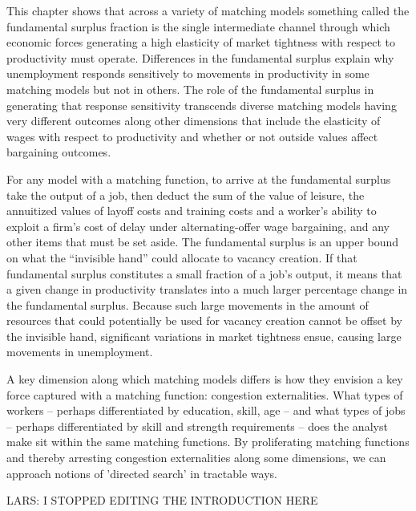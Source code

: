 This chapter shows that across a variety of matching models
something called the fundamental surplus fraction is the
single intermediate channel through which economic forces
generating a high elasticity of market tightness with
respect to productivity must operate.  Differences in the  fundamental surplus
explain  why unemployment responds sensitively to
movements in productivity in some matching models but not in
others. The role of the fundamental surplus in generating that response sensitivity
transcends diverse matching models having
very different outcomes along other dimensions that include the elasticity of
wages with respect to productivity %
and
whether or not outside values affect bargaining outcomes.




For any model with a matching function,  to arrive at the fundamental surplus take the output of a job, then deduct the
sum of the value of leisure,
the annuitized values of layoff costs and training costs and a worker's
ability to exploit a firm's cost of delay under
alternating-offer wage bargaining, and  any other items that must
be set aside. The fundamental surplus is an
upper bound on what the ``invisible hand'' could allocate
to vacancy creation. If that fundamental surplus constitutes
a small fraction of a job's output, it means that a given change
in productivity translates into a  much larger percentage
change in the fundamental surplus. Because such large movements in the
amount of resources that could potentially be used for vacancy
creation cannot be offset by the invisible hand,
significant variations in market tightness ensue,  causing large
movements in unemployment.

A key dimension along which matching models differs
is how they envision   a key force captured with a matching function: congestion externalities.   What types of workers -- perhaps differentiated by education, skill, age --
and what types of jobs -- perhaps differentiated by skill and strength requirements -- 
does the analyst make sit within the same matching functions.   By proliferating  matching functions
and thereby arresting congestion externalities along some dimensions,  we can approach notions of 
'directed search' in tractable ways.

LARS: I STOPPED EDITING THE INTRODUCTION HERE


  
  

